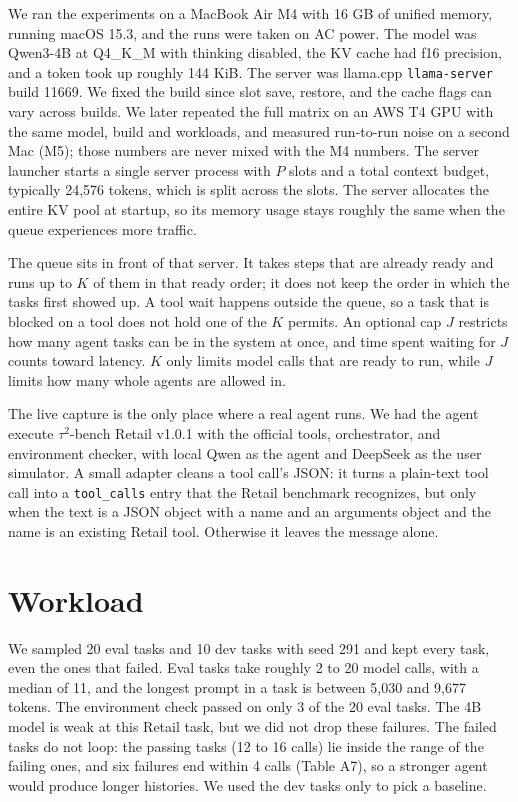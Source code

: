 \documentclass[9pt,twocolumn]{extarticle}
\begin{document}
We ran the experiments on a MacBook Air M4 with 16 GB of unified memory, running macOS 15.3, and the runs were taken on AC power. The model was Qwen3-4B at Q4\_K\_M with thinking disabled, the KV cache had f16 precision, and a token took up roughly 144 KiB. The server was llama.cpp \texttt{llama-server} build 11669. We fixed the build since slot save, restore, and the cache flags can vary across builds. We later repeated the full matrix on an AWS T4 GPU with the same model, build and workloads, and measured run-to-run noise on a second Mac (M5); those numbers are never mixed with the M4 numbers. The server launcher starts a single server process with $P$ slots and a total context budget, typically 24,576 tokens, which is split across the slots. The server allocates the entire KV pool at startup, so its memory usage stays roughly the same when the queue experiences more traffic.

The queue sits in front of that server. It takes steps that are already ready and runs up to $K$ of them in that ready order; it does not keep the order in which the tasks first showed up. A tool wait happens outside the queue, so a task that is blocked on a tool does not hold one of the $K$ permits. An optional cap $J$ restricts how many agent tasks can be in the system at once, and time spent waiting for $J$ counts toward latency. $K$ only limits model calls that are ready to run, while $J$ limits how many whole agents are allowed in.

The live capture is the only place where a real agent runs. We had the agent execute $\tau^{2}$-bench Retail v1.0.1 with the official tools, orchestrator, and environment checker, with local Qwen as the agent and DeepSeek as the user simulator. A small adapter cleans a tool call's JSON: it turns a plain-text tool call into a \texttt{tool\_calls} entry that the Retail benchmark recognizes, but only when the text is a JSON object with a name and an arguments object and the name is an existing Retail tool. Otherwise it leaves the message alone.

\section{Workload}

We sampled 20 eval tasks and 10 dev tasks with seed 291 and kept every task, even the ones that failed. Eval tasks take roughly 2 to 20 model calls, with a median of 11, and the longest prompt in a task is between 5,030 and 9,677 tokens. The environment check passed on only 3 of the 20 eval tasks. The 4B model is weak at this Retail task, but we did not drop these failures. The failed tasks do not loop: the passing tasks (12 to 16 calls) lie inside the range of the failing ones, and six failures end within 4 calls (Table A7), so a stronger agent would produce longer histories. We used the dev tasks only to pick a baseline.
\end{document}
